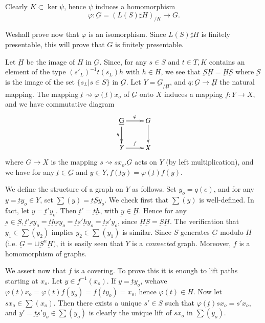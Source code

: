 Clearly $K \subset \ker \psi$, hence $\psi$ induces a homomorphism 
$$
\varphi : \underbar{G}= (L(S) \sharp H)_{/K} \to G.
$$

We\pageoriginale shall prove now that $\varphi$ is an isomorphism. Since $L(S)
\sharp H$ is finitely presentable, this will prove that $G$ is
finitely presentable. 

Let $\underbar{H}$ be the image of $H$ in $\underbar{G}$. Since, for
any $s \in S$ and $t \in T,K$ contains an element of the type
$(s'_L)^{-1} t(s_L)h$ with $h \in H$, we see that
$\underbar{S}\underbar{H} = \underbar{H}\underbar{S}$ where
$\underbar{S}$ is the image of the set $\{ s_L | s \in S \} $ in
$\underbar{G}$. Let $Y = \underbar{G}_{/\underbar{H}}$, and
$q:\underbar{G} \to \underbar{H} $ the natural mapping. The mapping
$\underbar{t} \rightsquigarrow \varphi(\underbar{t})x_o$ of
$\underbar{G}$ onto $X$ induces a mapping $f : Y \to X$,  and we have
commutative diagram  
\[
\xymatrix{\underbar{G} \ar[d]_q \ar[r]^\varphi & G \ar[d]\\
Y \ar[r]^f & X}
\]
where $G \to X$ is the mapping $s \rightsquigarrow sx_o. \underbar{G}$
acts on $Y$ (by left multiplication), and we have for any $\underbar{t}
\in \underbar{G}$ and $y \in Y , f(\underbar{t} y) = \varphi
(\underbar{t}) f(y)$. 

We define the structure of a graph on $Y$ as follows. Set $y_o = q
(\underbar{e})$, and for any $y = \underbar{t} y_o \in Y$, set $\sum
(y) = \underbar{t} \underbar{S} y_o$. We check first that $\sum (y)$
is well-defined. In fact, let $y = \underbar{t}' y_o$. Then
$\underbar{t}' = \underbar{t} \underbar{h}$, with $\underbar{y} \in
\underbar{H}$. Hence for any $\underbar{s} \in \underbar{S},
\underbar{t}' \underbar{s} y_o = \underbar{t} \underbar{h}
\underbar{s} y_o= \underbar{t}\underbar{s}' \underbar{h} y_o =
\underbar{t} \underbar{s}'y_o$, since $\underbar{H} \underbar{S} =
\underbar{S} \underbar{H}$. The verification that $y_1 \in \sum (y_2)$
implies $y_2 \in \sum(y_1)$ is similar. Since $S$ generates
$\underbar{G}$ modulo $\underbar{H}$ (i.e. $\underbar{G} = \cup
\underbar{S}^n \underbar{H})$, it is easily seen that $Y$  is a
\textit{connected} graph. Moreover, $f$ is a homomorphism of
graphs. 

We assert now that $f$ is a covering. To prove this it is enough to
lift paths starting at $x_o$. Let $y \in f^{-1}(x_o)$. If $y =
\underbar{t}y_o$, we\pageoriginale have $\varphi (\underbar{t}) x_o = \varphi
(\underbar{t}) f(y_o)= f(\underbar{t} y_o) = x_o$, hence
$\varphi(\underbar{t}) \in H$. Now let $sx_o \in \sum (x_o)$. Then
there exists a unique $s' \in S$ such that $\varphi (\underbar{t})
sx_o = s'x_o$, and $y' = \underbar{t} \underbar{s}' y_o \in \sum
(y_o)$ is clearly the unique lift of $sx_o$ in $\sum (y_o)$. 

